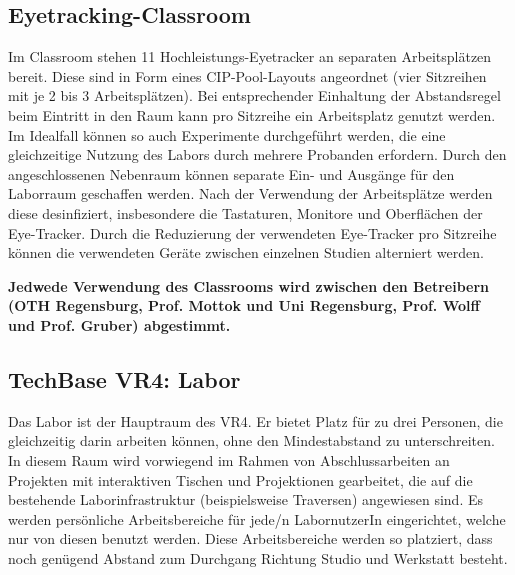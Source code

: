 \subsection{Eyetracking-Classroom}\label{subsec:labore_eyetracking}


\noindent
Im Classroom stehen 11 Hochleistungs-Eyetracker an separaten Arbeitsplätzen bereit.
Diese sind in Form eines CIP-Pool-Layouts angeordnet (vier Sitzreihen mit je 2 bis 3 Arbeitsplätzen).
Bei entsprechender Einhaltung der Abstandsregel beim Eintritt in den Raum kann pro Sitzreihe ein Arbeitsplatz genutzt werden.
Im Idealfall können so auch Experimente durchgeführt werden, die eine gleichzeitige Nutzung des Labors durch mehrere Probanden erfordern.
Durch den angeschlossenen Nebenraum können separate Ein- und Ausgänge für den Laborraum geschaffen werden.
Nach der Verwendung der Arbeitsplätze werden diese desinfiziert, insbesondere die Tastaturen, Monitore und Oberflächen der Eye-Tracker.
Durch die Reduzierung der verwendeten Eye-Tracker pro Sitzreihe können die verwendeten Geräte zwischen einzelnen Studien alterniert werden.

\medskip

\noindent
\textbf{Jedwede Verwendung des Classrooms wird zwischen den Betreibern (OTH Regensburg, Prof. Mottok und Uni Regensburg, Prof. Wolff und Prof. Gruber) abgestimmt.}

\subsection{TechBase VR4: Labor}\label{subsec:labore_vr4_labor}


\noindent
Das Labor ist der Hauptraum des VR4. Er bietet Platz für zu drei Personen, die gleichzeitig darin arbeiten können, ohne den Mindestabstand zu unterschreiten. In diesem Raum wird vorwiegend im Rahmen von Abschlussarbeiten an Projekten mit interaktiven Tischen und Projektionen gearbeitet, die auf die bestehende Laborinfrastruktur (beispielsweise Traversen) angewiesen sind.
Es werden persönliche Arbeitsbereiche für jede/n LabornutzerIn eingerichtet, welche nur von diesen benutzt werden.
Diese Arbeitsbereiche werden so platziert, dass noch genügend Abstand zum Durchgang Richtung Studio und Werkstatt besteht.

